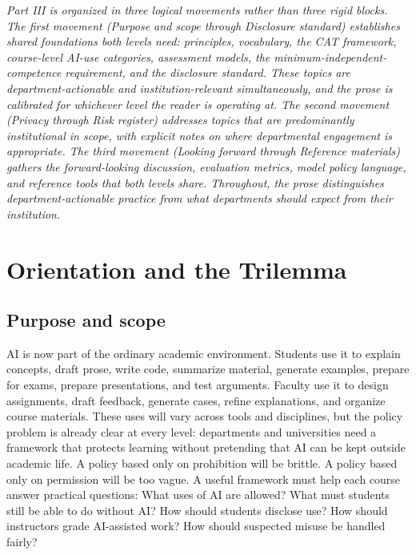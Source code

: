 \documentclass{SIAMbook2023}
\begin{document}
\textit{Part III is organized in three logical movements rather than three rigid blocks. The first movement (Purpose and scope through Disclosure standard) establishes shared foundations both levels need: principles, vocabulary, the CAT framework, course-level AI-use categories, assessment models, the minimum-independent-competence requirement, and the disclosure standard. These topics are department-actionable and institution-relevant simultaneously, and the prose is calibrated for whichever level the reader is operating at. The second movement (Privacy through Risk register) addresses topics that are predominantly institutional in scope, with explicit notes on where departmental engagement is appropriate. The third movement (Looking forward through Reference materials) gathers the forward-looking discussion, evaluation metrics, model policy language, and reference tools that both levels share. Throughout, the prose distinguishes department-actionable practice from what departments should expect from their institution.}

\chapter{Orientation and the Trilemma}
\label{u:ch:orientation-and-the-trilemma}%

\section{Purpose and scope}
\label{u:sec:purpose}

AI is now part of the ordinary academic environment. Students use it to explain concepts, draft prose, write code, summarize material, generate examples, prepare for exams, prepare presentations, and test arguments. Faculty use it to design assignments, draft feedback, generate cases, refine explanations, and organize course materials. These uses will vary across tools and disciplines, but the policy problem is already clear at every level: departments and universities need a framework that protects learning without pretending that AI can be kept outside academic life. A policy based only on prohibition will be brittle. A policy based only on permission will be too vague. A useful framework must help each course answer practical questions: What uses of AI are allowed? What must students still be able to do without AI? How should students disclose use? How should instructors grade AI-assisted work? How should suspected misuse be handled fairly?
\end{document}
